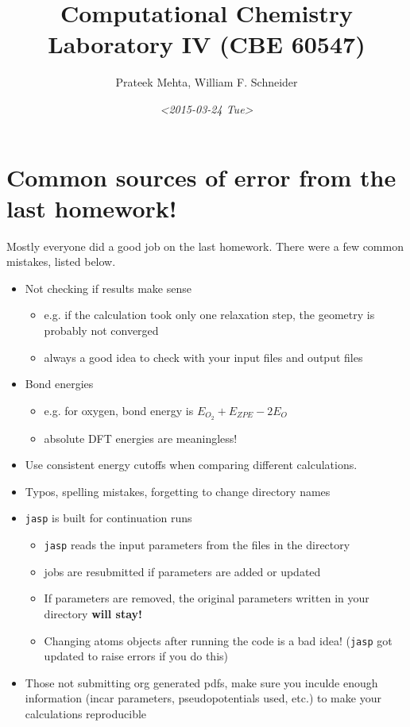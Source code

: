 \documentclass[11pt]{article}
\author{Prateek Mehta, William F. Schneider}
\date{\textit{<2015-03-24 Tue>}}
\title{Computational Chemistry Laboratory IV (CBE 60547)}
\begin{document}
\maketitle


\section{Common sources of error from the last homework!}
\label{sec-1}

Mostly everyone did a good job on the last homework. There were a few common mistakes, listed below.

\begin{itemize}
\item Not checking if results make sense
\begin{itemize}
\item e.g. if the calculation took only one relaxation step, the geometry is probably not converged
\item always a good idea to check with your input files and output files
\end{itemize}

\item Bond energies 
\begin{itemize}
\item e.g. for oxygen, bond energy is $E_{O_{2}} + E_{ZPE} - 2E_{O}$
\item absolute DFT energies are meaningless!
\end{itemize}

\item Use consistent energy cutoffs when comparing different calculations.

\item Typos, spelling mistakes, forgetting to change directory names

\item \texttt{jasp} is built for continuation runs
\begin{itemize}
\item \texttt{jasp} reads the input parameters from the files in the directory
\item jobs are resubmitted if parameters are added or updated
\item If parameters are removed, the original parameters written in your directory \textbf{will stay!}
\item Changing atoms objects after running the code is a bad idea! (\texttt{jasp} got updated to raise errors if you do this)
\end{itemize}

\item Those not submitting org generated pdfs, make sure you inculde enough information (incar parameters, pseudopotentials used, etc.) to make your calculations reproducible
\end{itemize}
\end{document}
